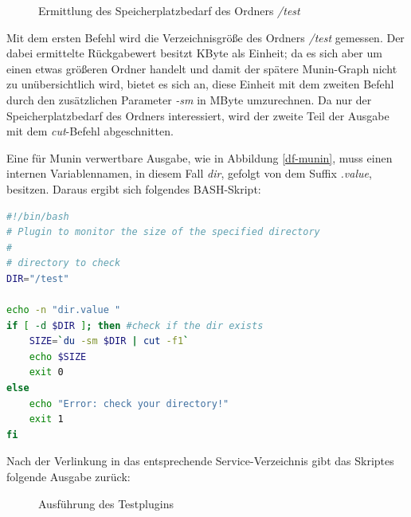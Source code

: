 \begin{figure}[ht]
	\centering
		\caption{Ermittlung des Speicherplatzbedarf des Ordners \textit{/test}}
		\label{du1}
\end{figure}

Mit dem ersten Befehl wird die Verzeichnisgröße des Ordners \textit{/test} gemessen.
Der dabei ermittelte Rückgabewert besitzt KByte als Einheit; da es sich aber um einen etwas größeren Ordner handelt und damit der spätere Munin-Graph nicht zu unübersichtlich wird, bietet es sich an, diese Einheit mit dem zweiten Befehl durch den zusätzlichen Parameter \textit{-sm} in MByte umzurechnen.
Da nur der Speicherplatzbedarf des Ordners interessiert, wird der zweite Teil der Ausgabe mit dem \textit{cut}-Befehl abgeschnitten.

Eine für Munin verwertbare Ausgabe, wie in Abbildung \ref{df-munin}, muss einen internen Variablennamen, in diesem Fall \textit{dir}, gefolgt von dem Suffix \textit{.value}, besitzen.
Daraus ergibt sich folgendes BASH-Skript:

\begin{lstlisting}[captionpos=b, caption=Speicherplatzbedarf eines Verzeichnisses, label=du, breaklines = true, language=bash]
#!/bin/bash
# Plugin to monitor the size of the specified directory
#
# directory to check
DIR="/test"

echo -n "dir.value "
if [ -d $DIR ]; then #check if the dir exists
    SIZE=`du -sm $DIR | cut -f1`
    echo $SIZE
    exit 0
else
    echo "Error: check your directory!"
    exit 1
fi
\end{lstlisting}

Nach der Verlinkung in das entsprechende Service-Verzeichnis gibt das Skriptes folgende Ausgabe zurück:

\begin{figure}[ht]
	\centering
		\caption{Ausführung des Testplugins}
		\label{du2}
\end{figure}

